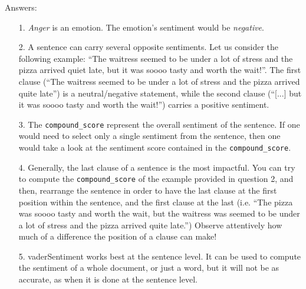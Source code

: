 		Answers:
	\begin{itemize}
		\item [1.] \textit{Anger} is an emotion. The emotion's sentiment would be \textit{negative}.
		\item [2.] A sentence can carry several opposite sentiments. Let us consider the following example: ``The waitress seemed to be under a lot of stress and the pizza arrived quiet late, but it was soooo tasty and worth the wait!''. The first clause (``The waitress seemed to be under a lot of stress and the pizza arrived quite late'') is a neutral/negative statement, while the second clause (``[...] but it was soooo tasty and worth the wait!'') carries a positive sentiment.
		\item [3.] The \verb|compound_score| represent the overall sentiment of the sentence. If one would need to select only a single sentiment from the sentence, then one would take a look at the sentiment score contained in the \verb|compound_score|.
		\item [4.] Generally, the last clause of a sentence is the most impactful. You can try to compute the \verb|compound_score| of the example provided in question 2, and then, rearrange the sentence in order to have the last clause at the first position within the sentence, and the first clause at the last (i.e. ``The pizza was soooo tasty and worth the wait, but the waitress was seemed to be under a lot of stress and the pizza arrived quite late.'') Observe attentively how much of a difference the position of a clause can make!
		\item [5.] vaderSentiment works best at the sentence level. It can be used to compute the sentiment of a whole document, or just a word, but it will not be as accurate, as when it is done at the sentence level.
	\end{itemize}

